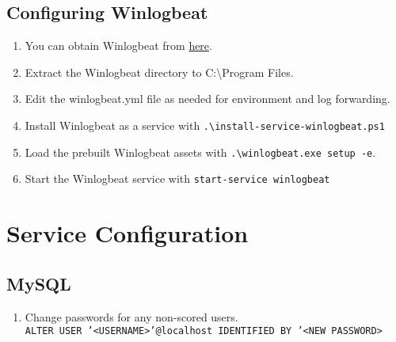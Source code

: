 \documentclass[12pt,letterpaper]{article}
\def\code#1{\textcolor{c2}{\texttt{#1}}}
\begin{document}
\pagebreak

\subsection{Configuring Winlogbeat}

\begin{enumerate}
	\item You can obtain Winlogbeat from \href{https://artifacts.elastic.co/downloads/beats/winlogbeat/winlogbeat-8.12.0-windows-x86_64.zip}{here}.
	\item Extract the Winlogbeat directory to C:\textbackslash{}Program Files.
	\item Edit the winlogbeat.yml file as needed for environment and log forwarding.
	\item Install Winlogbeat as a service with \code{.\textbackslash{}install-service-winlogbeat.ps1}
	\item Load the prebuilt Winlogbeat assets with \code{.\textbackslash{}winlogbeat.exe setup -e}.
	\item Start the Winlogbeat service with \code{start-service winlogbeat}
\end{enumerate}

\pagebreak

\section{Service Configuration}

\subsection{MySQL}

\begin{enumerate}
	\item Change passwords for any non-scored users. \\
		\code{ALTER USER '<USERNAME>'@localhost IDENTIFIED BY '<NEW PASSWORD>}
\end{enumerate}
\end{document}
